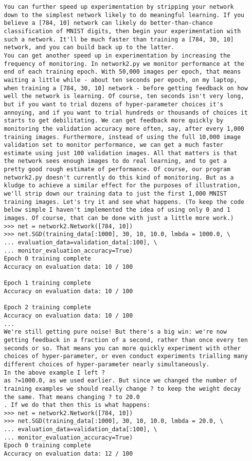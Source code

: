 \begin{lstlisting}
You can further speed up experimentation by stripping your network down to the simplest network likely to do meaningful learning. If you believe a [784, 10] network can likely do better-than-chance classification of MNIST digits, then begin your experimentation with such a network. It'll be much faster than training a [784, 30, 10] network, and you can build back up to the latter.
You can get another speed up in experimentation by increasing the frequency of monitoring. In network2.py we monitor performance at the end of each training epoch. With 50,000 images per epoch, that means waiting a little while - about ten seconds per epoch, on my laptop, when training a [784, 30, 10] network - before getting feedback on how well the network is learning. Of course, ten seconds isn't very long, but if you want to trial dozens of hyper-parameter choices it's annoying, and if you want to trial hundreds or thousands of choices it starts to get debilitating. We can get feedback more quickly by monitoring the validation accuracy more often, say, after every 1,000 training images. Furthermore, instead of using the full 10,000 image validation set to monitor performance, we can get a much faster estimate using just 100 validation images. All that matters is that the network sees enough images to do real learning, and to get a pretty good rough estimate of performance. Of course, our program network2.py doesn't currently do this kind of monitoring. But as a kludge to achieve a similar effect for the purposes of illustration, we'll strip down our training data to just the first 1,000 MNIST training images. Let's try it and see what happens. (To keep the code below simple I haven't implemented the idea of using only 0 and 1 images. Of course, that can be done with just a little more work.)
>>> net = network2.Network([784, 10])
>>> net.SGD(training_data[:1000], 30, 10, 10.0, lmbda = 1000.0, \
... evaluation_data=validation_data[:100], \
... monitor_evaluation_accuracy=True)
Epoch 0 training complete
Accuracy on evaluation data: 10 / 100

Epoch 1 training complete
Accuracy on evaluation data: 10 / 100

Epoch 2 training complete
Accuracy on evaluation data: 10 / 100
...
We're still getting pure noise! But there's a big win: we're now getting feedback in a fraction of a second, rather than once every ten seconds or so. That means you can more quickly experiment with other choices of hyper-parameter, or even conduct experiments trialling many different choices of hyper-parameter nearly simultaneously.
In the above example I left ?
as ?=1000.0, as we used earlier. But since we changed the number of training examples we should really change ? to keep the weight decay the same. That means changing ? to 20.0
. If we do that then this is what happens:
>>> net = network2.Network([784, 10])
>>> net.SGD(training_data[:1000], 30, 10, 10.0, lmbda = 20.0, \
... evaluation_data=validation_data[:100], \
... monitor_evaluation_accuracy=True)
Epoch 0 training complete
Accuracy on evaluation data: 12 / 100


\end{lstlisting}
